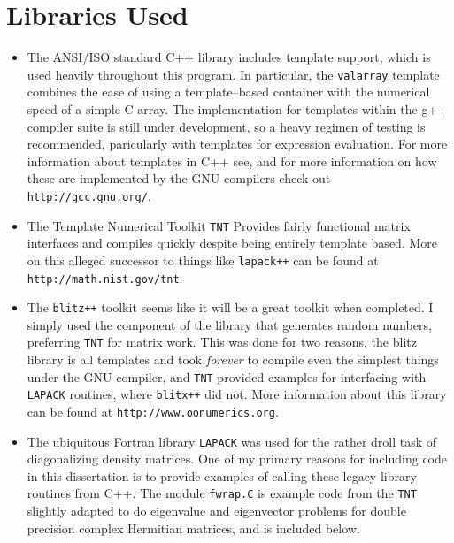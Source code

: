\section{Libraries Used}

\begin{itemize}

\item
The ANSI/ISO standard C++ library includes template support,
which is used heavily throughout this program.
In particular, the \texttt{valarray} 
template combines the ease of using a template--based
container with the numerical speed of a simple
C array.  The implementation for templates within the g++
compiler suite is still under development, so a heavy
regimen of testing is recommended, paricularly with
templates for expression evaluation.
For more information about 
templates in C++ see\cite{Stroustrup:97}, and
for more information on how these are implemented
by the GNU compilers check out
\texttt{http://gcc.gnu.org/}.

\item
The Template Numerical Toolkit \texttt{TNT} 
Provides fairly functional matrix interfaces
and compiles quickly despite being entirely
template based.  More on this alleged successor to
things like \texttt{lapack++} can be found at
\texttt{http://math.nist.gov/tnt}.


\item
The \texttt{blitz++} toolkit seems like it will be a great toolkit
when completed.  I simply used the component of the library
that generates random numbers, preferring \texttt{TNT} 
for matrix work.  This was done for two reasons,
the blitz library is all templates and took \emph{forever}
to compile even the simplest things under the GNU compiler,
and \texttt{TNT} provided examples for interfacing 
with \texttt{LAPACK} routines, where \texttt{blitx++}
did not.
More information about this library can be found at
\texttt{http://www.oonumerics.org}.

\item
The ubiquitous Fortran library \texttt{LAPACK} was used 
for the rather droll
task of diagonalizing density matrices.  One of my primary
reasons for including code in this dissertation is to provide
examples of calling these legacy library routines from C++.
The module \texttt{fwrap.C} is example code from the 
\texttt{TNT}
slightly adapted to do eigenvalue and eigenvector problems
for double precision complex Hermitian matrices, and is
included below.

\end{itemize}

